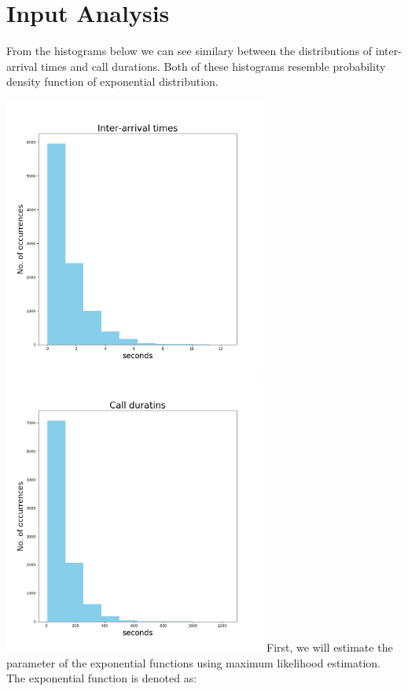 \documentclass[12pt,a4paper]{article}
\begin{document}
\section{Input Analysis}
From the histograms below we can see similary between the distributions of inter-arrival times and call durations. Both of these histograms resemble probability density function of exponential distribution.\par
\smallskip
\noindent \includegraphics[width=3.4in]{Figure_1}
\includegraphics[width=3.4in]{Figure_3}
First, we will estimate the parameter of the exponential functions using maximum likelihood estimation.
The exponential function is denoted as:
\end{document}
